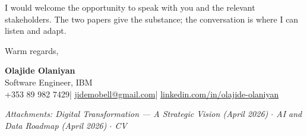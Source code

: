 \documentclass[10pt]{article}
\begin{document}
\vspace{6pt}
I would welcome the opportunity to speak with you and the relevant stakeholders.
The two papers give the substance; the conversation is where I can listen and adapt.

\vspace{12pt}

Warm regards,

\vspace{14pt}

\textbf{Olajide Olaniyan}\\
{\small Software Engineer, IBM}\\
{\small +353 89 982 7429\quad|\quad
\href{mailto:jidemobell@gmail.com}{jidemobell@gmail.com}\quad|\quad
\href{https://linkedin.com/in/olajide-olaniyan}{linkedin.com/in/olajide-olaniyan}}

\vspace{8pt}
{\small\color{darkgrey}
\textit{Attachments: Digital Transformation --- A Strategic Vision (April 2026) $\cdot$
AI and Data Roadmap (April 2026) $\cdot$ CV}
}
\end{document}
